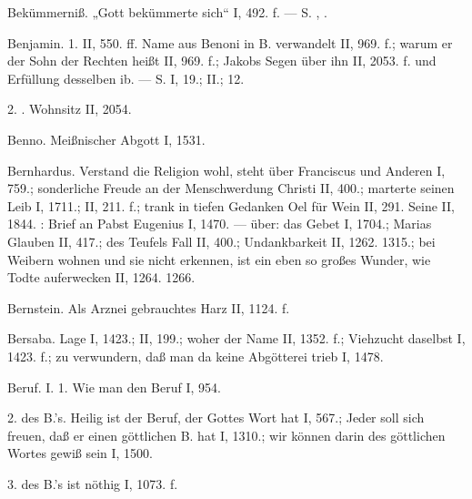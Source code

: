 Bekümmerniß. „Gott bekümmerte sich“ I, 492. f. — S. , .

Benjamin. 1.  II, 550. ff. Name aus Benoni in B. verwandelt II, 969. f.; warum er der Sohn der Rechten heißt II, 969. f.; Jakobs Segen über ihn II, 2053. f. und Erfüllung desselben ib. — S.  I, 19.; II.;  12.

2. . Wohnsitz II, 2054.

Benno. Meißnischer Abgott I, 1531.

Bernhardus. Verstand die Religion wohl, steht über Franciscus und Anderen I, 759.; sonderliche Freude an der Menschwerdung Christi II, 400.; marterte seinen Leib I, 1711.; II, 211. f.; trank in tiefen Gedanken Oel für Wein II, 291. Seine  II, 1844. : Brief an Pabst Eugenius I, 1470. —  über: das Gebet I, 1704.; Marias Glauben II, 417.; des Teufels Fall II, 400.; Undankbarkeit II, 1262. 1315.; bei Weibern wohnen und sie nicht erkennen, ist ein eben so großes Wunder, wie Todte auferwecken II, 1264. 1266.

Bernstein. Als Arznei gebrauchtes Harz II, 1124. f.

Bersaba. Lage I, 1423.; II, 199.; woher der Name II, 1352. f.; Viehzucht daselbst I, 1423. f.; zu verwundern, daß man da keine Abgötterei trieb I, 1478.

Beruf. I. 1. Wie man den Beruf  I, 954.

2.  des B.’s. Heilig ist der Beruf, der Gottes Wort hat I, 567.; Jeder soll sich freuen, daß er einen göttlichen B. hat I, 1310.; wir können darin des göttlichen Wortes gewiß sein I, 1500.

3.  des B.’s ist nöthig I, 1073. f.

